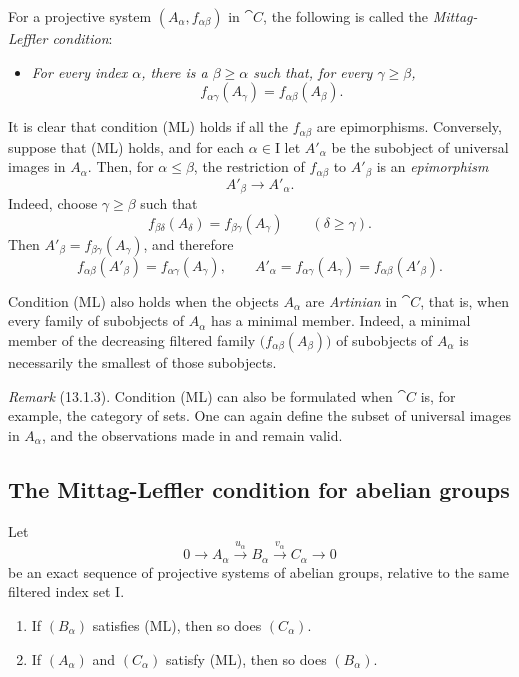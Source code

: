 \begin{env}[13.1.2]
\label{0.13.1.2}
For a projective system $(A_\alpha,f_{\alpha\beta})$ in $\cat{C}$,
the following is called the \emph{Mittag-Leffler condition}:
\begin{itemize}
  \item[\textbf{(ML)}]
  \emph{For every index $\alpha$, there is a $\beta\geq\alpha$ such
  that, for every $\gamma\geq\beta$,}
  \[
    f_{\alpha\gamma}(A_\gamma)
    =
    f_{\alpha\beta}(A_\beta).
  \]
\end{itemize}

It is clear that condition (ML) holds if all the
$f_{\alpha\beta}$ are epimorphisms.
Conversely, suppose that (ML) holds, and for each
$\alpha\in\mathrm{I}$ let $A'_\alpha$ be the subobject of universal
images in $A_\alpha$.
Then, for $\alpha\leq\beta$, the restriction of
$f_{\alpha\beta}$ to $A'_\beta$ is an \emph{epimorphism}
\[
  A'_\beta\longrightarrow A'_\alpha.
\]
Indeed, choose $\gamma\geq\beta$ such that
\[
  f_{\beta\delta}(A_\delta)
  =
  f_{\beta\gamma}(A_\gamma)
  \qquad(\delta\geq\gamma).
\]
Then $A'_\beta=f_{\beta\gamma}(A_\gamma)$, and therefore
\[
  f_{\alpha\beta}(A'_\beta)
  =
  f_{\alpha\gamma}(A_\gamma),
  \qquad
  A'_\alpha
  =
  f_{\alpha\gamma}(A_\gamma)
  =
  f_{\alpha\beta}(A'_\beta).
\]

Condition (ML) also holds when the objects $A_\alpha$ are
\emph{Artinian} in $\cat{C}$, that is, when every family of
subobjects of $A_\alpha$ has a minimal member.
Indeed, a minimal member of the decreasing filtered family
$\bigl(f_{\alpha\beta}(A_\beta)\bigr)$ of subobjects of $A_\alpha$
is necessarily the smallest of those subobjects.
\end{env}

\begin{env}[13.1.3]
\label{0.13.1.3}
\emph{Remark} (13.1.3).
Condition (ML) can also be formulated when $\cat{C}$ is, for
example, the category of sets.
One can again define the subset of universal images in $A_\alpha$,
and the observations made in  and
 remain valid.
\end{env}

\subsection{The Mittag-Leffler condition for abelian groups}
\label{subsection:0.13.2}

\begin{proposition}[13.2.1]
\label{0.13.2.1}
Let
\[
  0\longrightarrow A_\alpha
  \xrightarrow{u_\alpha}B_\alpha
  \xrightarrow{v_\alpha}C_\alpha
  \longrightarrow0
\]
be an exact sequence of projective systems of abelian groups, relative
to the same filtered index set $\mathrm{I}$.
\begin{enumerate}
  \item[{\rm(i)}]
  If $(B_\alpha)$ satisfies {\rm(ML)}, then so does $(C_\alpha)$.
  \item[{\rm(ii)}]
  If $(A_\alpha)$ and $(C_\alpha)$ satisfy {\rm(ML)}, then so does
  $(B_\alpha)$.
\end{enumerate}
\end{proposition}

